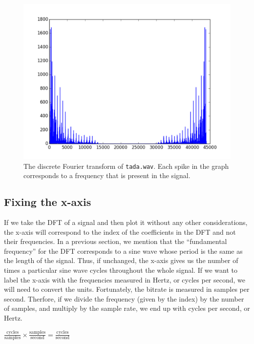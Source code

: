 \begin{center}
\begin{figure}
\includegraphics[scale=0.7]{figures/tada_dft}
\caption{The discrete Fourier transform of \texttt{tada.wav}.  Each spike in the graph corresponds to a frequency that is present in the signal.}
\label{fig:dft_tada}
\end{figure}
\end{center}

\subsection*{Fixing the x-axis} %

If we take the DFT of a signal and then plot it without any other considerations, the x-axis will correspond to the index of the coefficients in the DFT and not their frequencies.
In a previous section, we mention that the ``fundamental frequency'' for the DFT corresponds to a sine wave whose period is the same as the length of the signal.
Thus, if unchanged, the x-axis gives us the number of times a particular sine wave cycles throughout the whole signal.
If we want to label the x-axis with the frequencies measured in Hertz, or cycles per second, we will need to convert the units.
Fortunately, the bitrate is measured in samples per second.
Therfore, if we divide the frequency (given by the index) by the number of samples, and multiply by the sample rate, we end up with cycles per second, or Hertz.

\begin{center}
    $\frac{\mbox{cycles}}{\mbox{samples}} \times \frac{\mbox{samples}}{\mbox{second}} = \frac{\mbox{cycles}}{\mbox{second}}$
\end{center}

